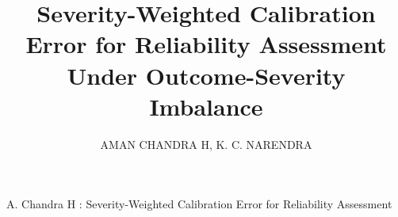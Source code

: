 \documentclass{ieeeaccess}
\begin{document}

\title{Severity-Weighted Calibration Error for Reliability Assessment Under Outcome-Severity Imbalance}

\author{\uppercase{Aman Chandra H},
\uppercase{K. C. Narendra}}

\address[1]{School of Computer Science and Engineering, RV University, Bengaluru, Karnataka 560059, India}


{A. Chandra H \headeretal: Severity-Weighted Calibration Error for Reliability Assessment}

\end{document}
